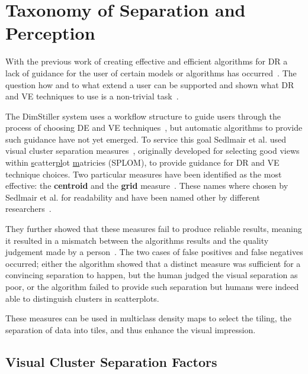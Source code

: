 \section{Taxonomy of Separation and Perception}

With the previous work of creating effective and efficient algorithms for DR a lack of guidance for the user of certain models or algorithms has occurred~\cite{sedlmair2012taxonomy,friendly2005early}. The question how and to what extend a user can be supported and shown what DR and VE techniques to use is a non-trivial task~\cite{sedlmair2012taxonomy}.

The DimStiller system uses a workflow structure to guide users through the process of choosing DE and VE techniques~\cite{ingram2010dimstiller}, but automatic algorithms to provide such guidance have not yet emerged. To service this goal Sedlmair et al. used visual cluster separation measures~\cite{sips2009selecting, tatu2009combining}, originally developed for selecting good views within \underline{s}catter\underline{pl}ot \underline{m}atricies (SPLOM), to provide guidance for DR and VE technique choices. Two particular measures have been identified as the most effective: the \textbf{centroid} and the \textbf{grid} measure~\cite{tatu2010visual}. These names where chosen by Sedlmair et al. for readability and have been named other by different researchers~\cite{sedlmair2012taxonomy}.

They further showed that these measures fail to produce reliable results, meaning it resulted in a mismatch between the algorithms results and the quality judgement made by a person~\cite{sedlmair2012taxonomy}. The two cases of false positives and false negatives occurred; either the algorithm showed that a distinct measure was sufficient for a convincing separation to happen, but the human judged the visual separation as poor, or the algorithm failed to provide such separation but humans were indeed able to distinguish clusters in scatterplots.

These measures can be used in multiclass density maps to select the tiling, the separation of data into tiles, and thus enhance the visual impression.


\subsection{Visual Cluster Separation Factors}

